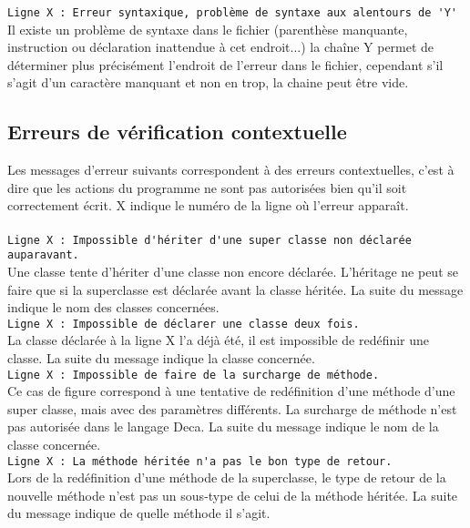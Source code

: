 \documentclass[12pt]{article}
\begin{document}
\lstinline!Ligne X : Erreur syntaxique, problème de syntaxe aux alentours de 'Y'!\\
Il existe un problème de syntaxe dans le fichier
(parenthèse manquante, instruction ou déclaration inattendue à cet endroit...)
la chaîne Y permet de déterminer plus précisément l'endroit de l'erreur dans
le fichier, cependant s'il s'agit d'un caractère manquant et non en trop, la
chaine peut être vide.\\

\subsection{Erreurs de vérification contextuelle}
Les messages d'erreur suivants correspondent à des erreurs contextuelles, c'est à dire que
les actions du programme ne sont pas autorisées bien qu'il soit correctement écrit. X indique
le numéro de la ligne où l'erreur apparaît.\\
\\
\lstinline!Ligne X : Impossible d'hériter d'une super classe non déclarée auparavant.!\\
Une classe tente d'hériter d'une classe non encore déclarée.
L'héritage ne peut se faire que si la superclasse est déclarée avant la classe héritée.
 La suite du message indique le nom des classes concernées.\\

\lstinline!Ligne X : Impossible de déclarer une classe deux fois.!\\
La classe déclarée à la ligne X l'a déjà été, il est impossible
de redéfinir une classe. La suite du message indique la classe concernée.\\

\lstinline!Ligne X : Impossible de faire de la surcharge de méthode.!\\
Ce cas de figure correspond à une tentative de redéfinition d'une méthode d'une super classe, mais
avec des paramètres différents. La surcharge de méthode n'est pas autorisée dans le langage Deca.
La suite du message indique le nom de la classe concernée.\\

\lstinline!Ligne X : La méthode héritée n'a pas le bon type de retour.!\\
Lors de la redéfinition d'une méthode de la superclasse, le type
de retour de la nouvelle méthode n'est pas un sous-type de celui de la méthode héritée. La suite
du message indique de quelle méthode il s'agit.\\
\end{document}
